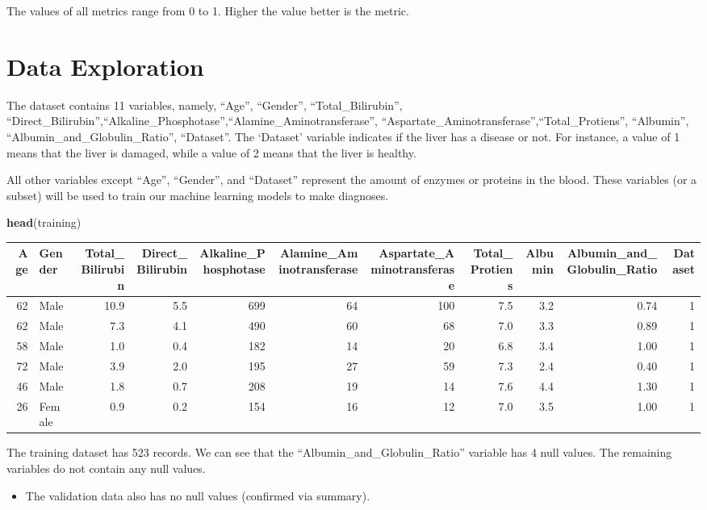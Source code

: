 \documentclass[]{article}
\newenvironment{Shaded}{\begin{snugshade}}{\end{snugshade}}
\newcommand{\KeywordTok}[1]{\textcolor[rgb]{0.13,0.29,0.53}{\textbf{#1}}}
\newcommand{\NormalTok}[1]{#1}
\begin{document}
The values of all metrics range from 0 to 1. Higher the value better is
the metric.

\section{Data Exploration}
\label{sec:exploration}

The dataset contains 11 variables, namely, ``Age'', ``Gender'',
``Total\_Bilirubin'',
``Direct\_Bilirubin'',``Alkaline\_Phosphotase'',``Alamine\_Aminotransferase'',
``Aspartate\_Aminotransferase'',``Total\_Protiens'', ``Albumin'',
``Albumin\_and\_Globulin\_Ratio'', ``Dataset''. The `Dataset' variable
indicates if the liver has a disease or not. For instance, a value of 1
means that the liver is damaged, while a value of 2 means that the liver
is healthy.

All other variables except ``Age'', ``Gender'', and ``Dataset''
represent the amount of enzymes or proteins in the blood. These
variables (or a subset) will be used to train our machine learning
models to make diagnoses.

\begin{Shaded}
\begin{Highlighting}[]
\KeywordTok{head}\NormalTok{(training)}
\end{Highlighting}
\end{Shaded}

\begin{longtable}[]{@{}rlrrrrrrrrr@{}}
\toprule
Age & Gender & Total\_Bilirubin & Direct\_Bilirubin &
Alkaline\_Phosphotase & Alamine\_Aminotransferase &
Aspartate\_Aminotransferase & Total\_Protiens & Albumin &
Albumin\_and\_Globulin\_Ratio & Dataset\tabularnewline
\midrule
\endhead
62 & Male & 10.9 & 5.5 & 699 & 64 & 100 & 7.5 & 3.2 & 0.74 &
1\tabularnewline
62 & Male & 7.3 & 4.1 & 490 & 60 & 68 & 7.0 & 3.3 & 0.89 &
1\tabularnewline
58 & Male & 1.0 & 0.4 & 182 & 14 & 20 & 6.8 & 3.4 & 1.00 &
1\tabularnewline
72 & Male & 3.9 & 2.0 & 195 & 27 & 59 & 7.3 & 2.4 & 0.40 &
1\tabularnewline
46 & Male & 1.8 & 0.7 & 208 & 19 & 14 & 7.6 & 4.4 & 1.30 &
1\tabularnewline
26 & Female & 0.9 & 0.2 & 154 & 16 & 12 & 7.0 & 3.5 & 1.00 &
1\tabularnewline
\bottomrule
\end{longtable}

The training dataset has 523 records. We can see that the
``Albumin\_and\_Globulin\_Ratio'' variable has 4 null values. The
remaining variables do not contain any null values.

\begin{itemize}
\item The validation data also has no null values (confirmed via summary).
\end{itemize}
\end{document}
